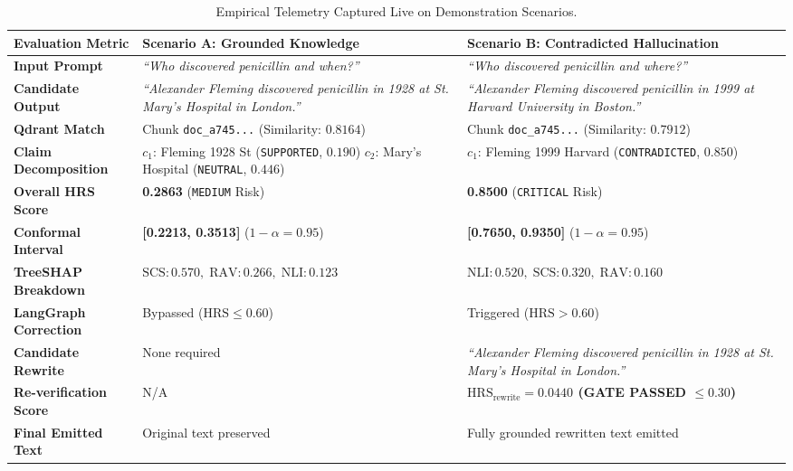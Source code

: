 \documentclass[11pt,a4paper]{article}
\begin{document}
\begin{table}[H]
\centering
\small
\renewcommand{\arraystretch}{1.3}
\begin{tabularx}{\linewidth}{p{3.2cm} X X}
\toprule
\textbf{Evaluation Metric} & \textbf{Scenario A: Grounded Knowledge} & \textbf{Scenario B: Contradicted Hallucination} \\
\midrule
\textbf{Input Prompt} & \textit{``Who discovered penicillin and when?''} & \textit{``Who discovered penicillin and where?''} \\
\textbf{Candidate Output} & \textit{``Alexander Fleming discovered penicillin in 1928 at St. Mary's Hospital in London.''} & \textit{``Alexander Fleming discovered penicillin in 1999 at Harvard University in Boston.''} \\
\textbf{Qdrant Match} & Chunk \texttt{doc\_a745...} (Similarity: $0.8164$) & Chunk \texttt{doc\_a745...} (Similarity: $0.7912$) \\
\textbf{Claim Decomposition} & $c_1$: Fleming 1928 St (\texttt{SUPPORTED}, $0.190$) \newline $c_2$: Mary's Hospital (\texttt{NEUTRAL}, $0.446$) & $c_1$: Fleming 1999 Harvard (\texttt{CONTRADICTED}, $0.850$) \\
\textbf{Overall HRS Score} & \textbf{0.2863} (\texttt{MEDIUM} Risk) & \textbf{0.8500} (\texttt{CRITICAL} Risk) \\
\textbf{Conformal Interval} & \textbf{[0.2213, 0.3513]} ($1-\alpha=0.95$) & \textbf{[0.7650, 0.9350]} ($1-\alpha=0.95$) \\
\textbf{TreeSHAP Breakdown} & $\text{SCS}: 0.570, \; \text{RAV}: 0.266, \; \text{NLI}: 0.123$ & $\text{NLI}: 0.520, \; \text{SCS}: 0.320, \; \text{RAV}: 0.160$ \\
\textbf{LangGraph Correction} & Bypassed ($\text{HRS} \le 0.60$) & Triggered ($\text{HRS} > 0.60$) \\
\textbf{Candidate Rewrite} & None required & \textit{``Alexander Fleming discovered penicillin in 1928 at St. Mary's Hospital in London.''} \\
\textbf{Re-verification Score} & N/A & \textbf{$\text{HRS}_{\text{rewrite}} = \mathbf{0.0440}$ (GATE PASSED $\le 0.30$)} \\
\textbf{Final Emitted Text} & Original text preserved & Fully grounded rewritten text emitted \\
\bottomrule
\end{tabularx}
\caption{Empirical Telemetry Captured Live on Demonstration Scenarios.}
\label{tab:live_telemetry}
\end{table}
\end{document}
